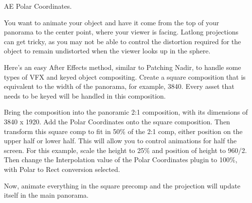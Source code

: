 \begin{fullwidth}
{\large AE Polar Coordinates. \par}

You want to animate your object and have it come from the top of your panorama to the center point, where your viewer is facing. Latlong projections can get tricky, as you may not be able to control the distortion required for the object to remain undistorted when the viewer looks up in the sphere.

Here’s an easy After Effects method, similar to Patching Nadir, to handle some types of VFX and keyed object compositing. Create a square composition that is equivalent to the width of the panorama, for example, 3840. Every asset that needs to be keyed will be handled in this composition. 

Bring the composition into the panoramic 2:1 composition, with its dimensions of 3840 x 1920. Add the Polar Coordinates onto the square composition. Then transform this square comp to fit in 50\% of the 2:1 comp, either position on the upper half or lower half. This will allow you to control animations for half the screen. For this example, scale the height to 25\% and position of height to 960/2. Then change the Interpolation value of the Polar Coordinates plugin to 100\%, with Polar to Rect conversion selected.

Now, animate everything in the square precomp and the projection will update itself in the main panorama.


\clearpage
\end{fullwidth}